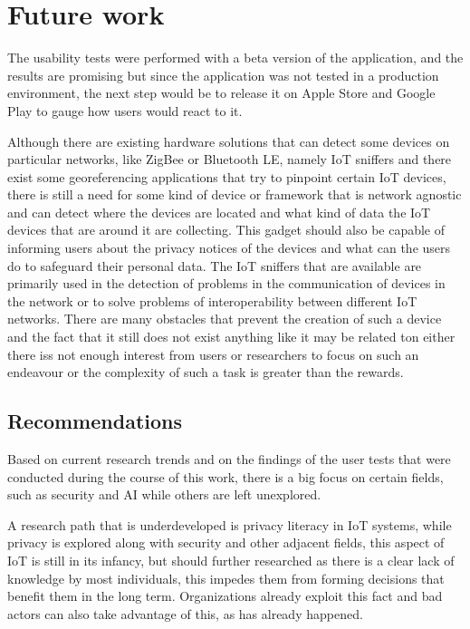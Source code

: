 %
%
\section{Future work}\label{section:future_work}

The usability tests were performed with a beta version of the application,
and the results are promising but since the application was not tested in a production environment,
the next step would be to release it on Apple Store and Google Play to
gauge how users would react to it.

Although there are existing hardware solutions that can detect some devices
on particular networks, like ZigBee or Bluetooth LE, namely IoT sniffers
and there exist some georeferencing applications that try to pinpoint certain
IoT devices, there is still a need for some kind of device or framework
that is network agnostic and can detect where the devices are located and
what kind of data the IoT devices that are around it are collecting. This
gadget should also be capable of informing users about the privacy notices
of the devices and what can the users do to safeguard their personal data.
The IoT sniffers that are available are primarily used in the detection
of problems in the communication of devices in the network or to solve problems
of interoperability between different IoT networks. There are many obstacles
that prevent the creation of such a device and the fact that it still does
not exist anything like it may be related ton either there iss not enough
interest from users or researchers to focus on such an endeavour or the
complexity of such a task is greater than the rewards.

\subsection{Recommendations}

Based on current research trends and on the findings of the user tests that were
conducted during the course of this work, there is a big focus on certain
fields, such as security and AI while others are left unexplored.

A research path that is underdeveloped is privacy literacy in IoT systems,
while privacy is explored along with security and other adjacent fields, this aspect of IoT
is still in its infancy, but should further researched as there is a
clear lack of knowledge by most individuals, this impedes them from
forming decisions that benefit them in the long term. Organizations
already exploit this fact and bad actors can also take advantage of this, as
has already happened.

